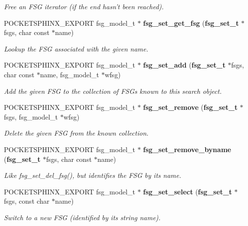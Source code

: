 \begin{DoxyCompactItemize}
\begin{DoxyCompactList}\small\item\em \-Free an \-F\-S\-G iterator (if the end hasn't been reached). \end{DoxyCompactList}\item 
\-P\-O\-C\-K\-E\-T\-S\-P\-H\-I\-N\-X\-\_\-\-E\-X\-P\-O\-R\-T fsg\-\_\-model\-\_\-t $\ast$ {\bf fsg\-\_\-set\-\_\-get\-\_\-fsg} ({\bf fsg\-\_\-set\-\_\-t} $\ast$fsgs, char const $\ast$name)
\begin{DoxyCompactList}\small\item\em \-Lookup the \-F\-S\-G associated with the given name. \end{DoxyCompactList}\item 
\-P\-O\-C\-K\-E\-T\-S\-P\-H\-I\-N\-X\-\_\-\-E\-X\-P\-O\-R\-T fsg\-\_\-model\-\_\-t $\ast$ {\bf fsg\-\_\-set\-\_\-add} ({\bf fsg\-\_\-set\-\_\-t} $\ast$fsgs, char const $\ast$name, fsg\-\_\-model\-\_\-t $\ast$wfsg)
\begin{DoxyCompactList}\small\item\em \-Add the given \-F\-S\-G to the collection of \-F\-S\-Gs known to this search object. \end{DoxyCompactList}\item 
\-P\-O\-C\-K\-E\-T\-S\-P\-H\-I\-N\-X\-\_\-\-E\-X\-P\-O\-R\-T fsg\-\_\-model\-\_\-t $\ast$ {\bf fsg\-\_\-set\-\_\-remove} ({\bf fsg\-\_\-set\-\_\-t} $\ast$fsgs, fsg\-\_\-model\-\_\-t $\ast$wfsg)\label{fsg__set_8h_ac46a51a7d298277e978821bb61236062}

\begin{DoxyCompactList}\small\item\em \-Delete the given \-F\-S\-G from the known collection. \end{DoxyCompactList}\item 
\-P\-O\-C\-K\-E\-T\-S\-P\-H\-I\-N\-X\-\_\-\-E\-X\-P\-O\-R\-T fsg\-\_\-model\-\_\-t $\ast$ {\bf fsg\-\_\-set\-\_\-remove\-\_\-byname} ({\bf fsg\-\_\-set\-\_\-t} $\ast$fsgs, char const $\ast$name)\label{fsg__set_8h_a48e53ea0b48930ab48a445240162746d}

\begin{DoxyCompactList}\small\item\em \-Like fsg\-\_\-set\-\_\-del\-\_\-fsg(), but identifies the \-F\-S\-G by its name. \end{DoxyCompactList}\item 
\-P\-O\-C\-K\-E\-T\-S\-P\-H\-I\-N\-X\-\_\-\-E\-X\-P\-O\-R\-T fsg\-\_\-model\-\_\-t $\ast$ {\bf fsg\-\_\-set\-\_\-select} ({\bf fsg\-\_\-set\-\_\-t} $\ast$fsgs, const char $\ast$name)
\begin{DoxyCompactList}\small\item\em \-Switch to a new \-F\-S\-G (identified by its string name). \end{DoxyCompactList}\end{DoxyCompactItemize}


